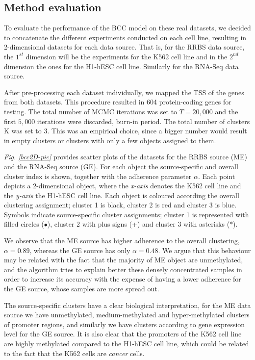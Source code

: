 \subsection{Method evaluation} \label{integr-method-eval-subsect}
To evaluate the performance of the BCC model on these real datasets, we decided to concatenate the different experiments conducted on each cell line, resulting in 2-dimensional datasets for each data source. That is, for the RRBS data source, the $1^{st}$ dimension will be the experiments for the K562 cell line and in the $2^{nd}$ dimension the ones for the H1-hESC cell line. Similarly for the RNA-Seq data source.

After pre-processing each dataset individually, we mapped the TSS of the genes from both datasets. This procedure resulted in 604 protein-coding genes for testing. The total number of MCMC iterations was set to $T=20,000$ and the first $5,000$ iterations were discarded, \ie burn-in period. The total number of clusters K was set to 3. This was an empirical choice, since a bigger number would result in empty clusters or clusters with only a few objects assigned to them. 

\emph{Fig. \ref{bcc2D-pic}} provides scatter plots of the datasets for the RRBS source (ME) and the RNA-Seq source (GE). For each object the source-specific and overall cluster index is shown, together with the adherence parameter $\alpha$. Each point depicts a 2-dimensional object, where the \emph{x-axis} denotes the K562 cell line and the \emph{y-axis} the H1-hESC cell line. Each object is coloured according the overall clustering assignment; cluster 1 is black, cluster 2 is red and cluster 3 is blue. Symbols indicate source-specific cluster assignments; cluster 1 is represented with filled circles ($\bullet$), cluster 2 with plus signs (+) and cluster 3 with asterisks ($\ast$). 

We observe that the ME source has higher adherence to the overall clustering, $\alpha=0.89$, whereas the GE source has only $\alpha=0.48$. We argue that this behaviour may be related with the fact that the majority of ME object are unmethylated, and the algorithm tries to explain better these densely concentrated samples in order to increase its accuracy with the expense of having a lower adherence for the GE source, whose samples are more spread out.

The source-specific clusters have a clear biological interpretation, for the ME data source we have unmethylated, medium-methylated and hyper-methylated clusters of promoter regions, and similarly we have clusters according to gene expression level for the GE source. It is also clear that the promoters of the K562 cell line are highly methylated compared to the H1-hESC cell line, which could be related to the fact that the K562 cells are \emph{cancer} cells. 

